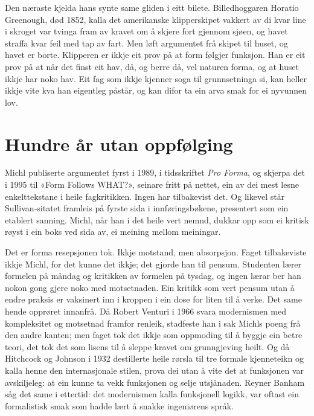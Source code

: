 Den næraste kjelda hans synte same gliden i eitt bilete. Billedhoggaren Horatio Greenough, død 1852, kalla det amerikanske klipperskipet vakkert av di kvar line i skroget var tvinga fram av kravet om å skjere fort gjennom sjøen, og havet straffa kvar feil med tap av fart. Men løft argumentet frå skipet til huset, og havet er borte. Klipperen er ikkje eit prov på at form følgjer funksjon. Han er eit prov på at når det finst eit hav, då, og berre då, vel naturen forma, og at huset ikkje har noko hav. Eit fag som ikkje kjenner soga til grunnsetninga si, kan heller ikkje vite kva han eigentleg påstår, og kan difor ta ein arva smak for ei nyvunnen lov.

\section{Hundre år utan oppfølging}

Michl publiserte argumentet fyrst i 1989, i tidsskriftet \emph{Pro Forma}, og skjerpa det i 1995 til «Form Follows WHAT?», seinare fritt på nettet, ein av dei mest lesne enkelttekstane i heile fagkritikken. Ingen har tilbakevist det. Og likevel står Sullivan-sitatet framleis på fyrste sida i innføringsbøkene, presentert som ein etablert sanning. Michl, når han i det heile vert nemnd, dukkar opp som ei kritisk røyst i ein boks ved sida av, ei meining mellom meiningar.

Det er forma resepsjonen tok. Ikkje motstand, men absorpsjon. Faget tilbakeviste ikkje Michl, for det kunne det ikkje; det gjorde han til pensum. Studenten lærer formelen på måndag og kritikken av formelen på tysdag, og ingen lærar ber han nokon gong gjere noko med motsetnaden. Ein kritikk som vert pensum utan å endre praksis er vaksinert inn i kroppen i ein dose for liten til å verke. Det same hende opprøret innanfrå. Då Robert Venturi i 1966 svara modernismen med kompleksitet og motsetnad framfor renleik, stadfeste han i sak Michls poeng frå den andre kanten\autocite{venturi1966}; men faget tok det ikkje som oppmoding til å byggje ein betre teori, det tok det som lisens til å sleppe kravet om grunngjeving heilt. Og då Hitchcock og Johnson i 1932 destillerte heile rørsla til tre formale kjenneteikn og kalla henne den internasjonale stilen, prova dei utan å vite det at funksjonen var avskiljeleg: at ein kunne ta vekk funksjonen og selje utsjånaden\autocite{hitchcock1932}. Reyner Banham såg det same i ettertid: det modernismen kalla funksjonell logikk, var oftast ein formalistisk smak som hadde lært å snakke ingeniørens språk\autocite{banham1960}.

